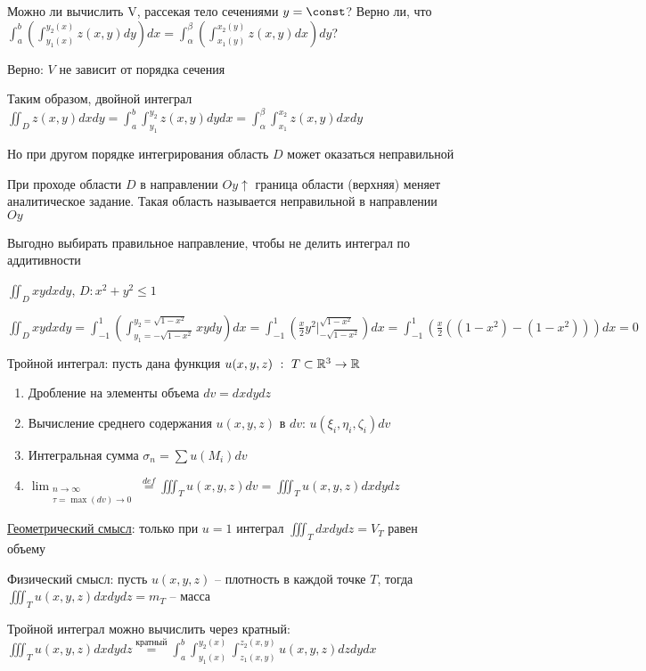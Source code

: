 \documentclass[12pt]{article}
\begin{document}
    Можно ли вычислить V, рассекая тело сечениями $y = \const$? Верно ли, что $\int_a^b \left(\int_{y_1(x)}^{y_2(x)} z(x, y) dy\right) dx = \int_\alpha^\beta \left(\int_{x_1(y)}^{x_2(y)} z(x, y) dx\right) dy$?

    Верно: $V$ не зависит от порядка сечения

    Таким образом, двойной интеграл $\iint_D z(x, y) dxdy = \int_a^b \int_{y_1}^{y_2} z(x, y) dydx = \int_\alpha^\beta \int_{x_1}^{x_2} z(x, y) dxdy$

    Но при другом порядке интегрирования область $D$ может оказаться неправильной

    \Def При проходе области $D$ в направлении $Oy \uparrow$ граница области (верхняя) меняет аналитическое задание. Такая область называется неправильной в направлении $Oy$

    Выгодно выбирать правильное направление, чтобы не делить интеграл по аддитивности

    \Ex $\iint_D xy dx dy$, $D : x^2 + y^2 \leq 1$

    $\iint_D xy dx dy = \int_{-1}^1 \left(\int_{y_1 = -\sqrt{1-x^2}}^{y_2 = \sqrt{1-x^2}} xy dy\right) dx = \int_{-1}^1 \left(\frac{x}{2} y^2 \Big|_{-\sqrt{1-x^2}}^{\sqrt{1-x^2}}\right) dx =
    \int_{-1}^1 \left(\frac{x}{2} ((1 - x^2) - (1 - x^2))\right) dx = 0$

    \hypertarget{tripleintegral}{}

    \Def Тройной интеграл: пусть дана функция $u(x, y, z) \ : \ T \subset \mathbb{R}^3 \rightarrow \mathbb{R}$

    \begin{enumerate}
        \item Дробление на элементы объема $dv = dxdydz$

        \item Вычисление среднего содержания $u(x, y, z)$ в $dv$: $u(\xi_i, \eta_i, \zeta_i) dv$

        \item Интегральная сумма $\sigma_n = \sum u(M_i) dv$

        \item $\lim_{\substack{n \to \infty \\ \tau = \max (dv) \to 0}} \stackrel{def}{=} \iiint_T u(x, y, z) dv = \iiint_T u(x, y, z) dxdydz$
    \end{enumerate}

    \underline{Геометрический смысл}: только при $u = 1$ интеграл $\iiint_T dxdydz = V_T$ равен объему

    Физический смысл: пусть $u(x, y, z)$ -- плотность в каждой точке $T$, тогда $\iiint_T u(x, y, z) dxdydz = m_T$ -- масса

    \hypertarget{tripleintegralcalculation}{}

    Тройной интеграл можно вычислить через кратный: $\iiint_T u(x, y, z) dxdydz \stackrel{\text{кратный}}{=} \int^b_a \int_{y_1(x)}^{y_2(x)} \int_{z_1(x, y)}^{z_2(x, y)} u(x, y, z) dz dy dx$
\end{document}
